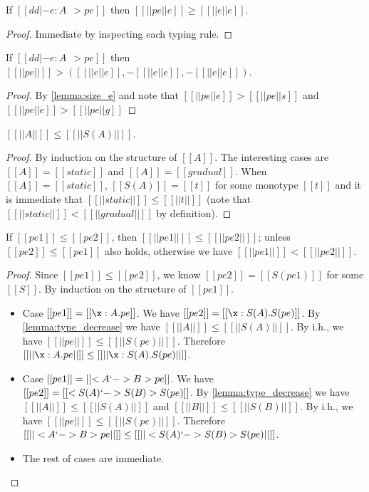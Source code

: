 \begin{lemma} \label{lemma:size_e}
  If $[[dd |- e : A ~~> pe]]$ then $[[ || pe ||e    ]] \geq [[ || e ||e   ]]  $.
\end{lemma}
\begin{proof}
  Immediate by inspecting each typing rule.
\end{proof}

\begin{corollary} \label{lemma:decrease_stop}
  If $[[dd |- e : A ~~> pe]]$ then $[[ || pe ||   ]] > ([[ || e ||e ]], -[[ || e ||e ]], -[[ || e ||e ]] )  $.
\end{corollary}
\begin{proof}
  By \cref{lemma:size_e} and note that $ [[ || pe ||e   ]] > [[  || pe ||s  ]] $ and $ [[ || pe ||e   ]] > [[  || pe ||g  ]] $
\end{proof}

\begin{lemma} \label{lemma:type_decrease}
  $[[ || A || ]] \leq [[ || S(A) || ]]  $.
\end{lemma}
\begin{proof}
  By induction on the structure of $[[A]]$. The interesting cases are $[[ A ]] = [[static]]$ and
  $[[ A ]] = [[gradual]]$. When $[[ A ]] = [[static]]$, $[[ S(A) ]] = [[t]]$
  for some monotype $[[t]]$ and it is immediate that $[[ || static ||  ]]  \leq [[ || t || ]] $
  (note that $[[ || static ||  ]] < [[ || gradual ||  ]] $ by definition).
\end{proof}

\begin{lemma}
  \label{lemma:subst_dec_measure}
  If $[[pe1]] \leq [[pe2]]$, then $ {[[ ||pe1|| ]]} \leq [[ ||pe2|| ]]$; unless
  $[[pe2]] \leq [[pe1]]$ also holds, otherwise we have $[[ ||pe1|| ]] < [[ ||pe2|| ]]$.
\end{lemma}
\begin{proof}
  Since $[[ pe1  ]] \leq [[  pe2  ]]$, we know $[[ pe2  ]] = [[ S(pe1)  ]]$ for some $[[S]]$. By induction on
  the structure of $[[pe1]]$.

  \begin{itemize}
  \item Case $[[pe1]] = [[  \x : A . pe ]]$. We have
    $[[ pe2  ]] = [[  \x : S(A) . S(pe)  ]]$. By \cref{lemma:type_decrease} we have $[[ || A || ]] \leq [[ || S(A) || ]]$.
    By i.h., we have $[[ || pe ||  ]] \leq [[ || S(pe) ||  ]]$. Therefore $[[ || \x : A . pe ||    ]] \leq [[ || \x : S(A) . S(pe) ||  ]]$.
  \item Case $[[pe1]] = [[ < A `-> B > pe  ]]$. We have
    $[[pe2]] = [[ < S(A) `-> S(B) > S(pe)  ]]$.  By \cref{lemma:type_decrease} we have $[[ || A || ]] \leq [[ || S(A) || ]]$
    and $[[ || B || ]] \leq [[ || S(B) || ]]$. By i.h., we have $[[ || pe ||  ]] \leq [[ || S(pe) ||  ]]$.
    Therefore $[[  || < A `-> B > pe ||  ]] \leq [[ || < S(A) `-> S(B) > S(pe)  ||   ]]$.

  \item The rest of cases are immediate.
  \end{itemize}
\end{proof}


